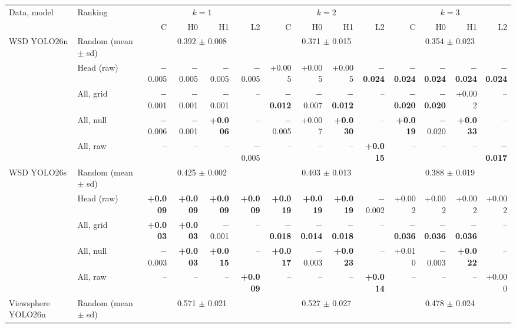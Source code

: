 \begin{tabular}{llrrrrrrrrrrrr}
\toprule
Data, model & Ranking & \multicolumn{4}{c}{$k=1$} & \multicolumn{4}{c}{$k=2$} & \multicolumn{4}{c}{$k=3$} \\
\cmidrule(lr){3-6}\cmidrule(lr){7-10}\cmidrule(lr){11-14}
 & & C & H0 & H1 & L2 & C & H0 & H1 & L2 & C & H0 & H1 & L2 \\
\midrule
WSD YOLO26n & Random (mean $\pm$ sd) & \multicolumn{4}{c}{0.392 $\pm$ 0.008} & \multicolumn{4}{c}{0.371 $\pm$ 0.015} & \multicolumn{4}{c}{0.354 $\pm$ 0.023} \\
 & Head (raw) & $-$0.005 & $-$0.005 & $-$0.005 & $-$0.005 & +0.005 & +0.005 & +0.005 & \textbf{$-$0.024} & \textbf{$-$0.024} & \textbf{$-$0.024} & \textbf{$-$0.024} & \textbf{$-$0.024} \\
 & All, grid & $-$0.001 & $-$0.001 & $-$0.001 & -- & \textbf{$-$0.012} & $-$0.007 & \textbf{$-$0.012} & -- & \textbf{$-$0.020} & \textbf{$-$0.020} & +0.002 & -- \\
 & All, null & $-$0.006 & $-$0.001 & \textbf{+0.006} & -- & $-$0.005 & +0.007 & \textbf{+0.030} & -- & \textbf{+0.019} & $-$0.020 & \textbf{+0.033} & -- \\
 & All, raw & -- & -- & -- & $-$0.005 & -- & -- & -- & \textbf{+0.015} & -- & -- & -- & \textbf{$-$0.017} \\
\midrule
WSD YOLO26s & Random (mean $\pm$ sd) & \multicolumn{4}{c}{0.425 $\pm$ 0.002} & \multicolumn{4}{c}{0.403 $\pm$ 0.013} & \multicolumn{4}{c}{0.388 $\pm$ 0.019} \\
 & Head (raw) & \textbf{+0.009} & \textbf{+0.009} & \textbf{+0.009} & \textbf{+0.009} & \textbf{+0.019} & \textbf{+0.019} & \textbf{+0.019} & $-$0.002 & +0.002 & +0.002 & +0.002 & +0.002 \\
 & All, grid & \textbf{+0.003} & \textbf{+0.003} & $-$0.001 & -- & \textbf{$-$0.018} & \textbf{$-$0.014} & \textbf{$-$0.018} & -- & \textbf{$-$0.036} & \textbf{$-$0.036} & \textbf{$-$0.036} & -- \\
 & All, null & $-$0.003 & \textbf{+0.003} & \textbf{+0.015} & -- & \textbf{+0.017} & $-$0.003 & \textbf{+0.023} & -- & +0.010 & $-$0.003 & \textbf{+0.022} & -- \\
 & All, raw & -- & -- & -- & \textbf{+0.009} & -- & -- & -- & \textbf{+0.014} & -- & -- & -- & +0.000 \\
\midrule
Viewsphere YOLO26n & Random (mean $\pm$ sd) & \multicolumn{4}{c}{0.571 $\pm$ 0.021} & \multicolumn{4}{c}{0.527 $\pm$ 0.027} & \multicolumn{4}{c}{0.478 $\pm$ 0.024} \\

\end{tabular}
